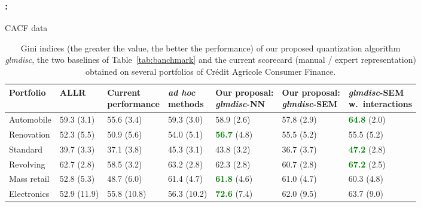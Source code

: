 \documentclass[english,xcolor={rgb,dvipsnames,table,usenames}]{beamer}
\begin{document}
\begin{frame}
\frametitle{\secname : \subsecname}

CACF data

\begin{table}
    \centering
        \caption{Gini indices (the greater the value, the better the performance) of our proposed quantization algorithm \textit{glmdisc}, the two baselines of Table~\ref{tab:banchmark} and the current scorecard (manual / expert representation) obtained on several portfolios of Cr\'edit Agricole Consumer Finance.}
    \label{tab:real_data_inter}
\begin{tiny}
\begin{tabular}{lllllll}
Portfolio & ALLR & \makecell{Current\\performance} & \makecell{\textit{ad hoc}\\methods} & \makecell{Our proposal:\\ \textit{glmdisc}-NN} & \makecell{Our proposal:\\ \textit{glmdisc}-SEM} & \makecell{\textit{glmdisc}-SEM\\ w.\ interactions} \\
\hline
Automobile & 59.3 (3.1) & 55.6 (3.4) & 59.3 (3.0) & 58.9 (2.6) & 57.8 (2.9) & \textcolor{green}{\bf{64.8}} (2.0) \\
Renovation & 52.3 (5.5) & 50.9 (5.6) & 54.0 (5.1) & \textcolor{green}{\bf{56.7}} (4.8) & 55.5 (5.2) & 55.5 (5.2) \\
Standard & 39.7 (3.3) & 37.1 (3.8) & 45.3 (3.1) & 43.8 (3.2) & 36.7 (3.7) & \textcolor{green}{\bf{47.2}} (2.8) \\
Revolving & 62.7 (2.8) & 58.5 (3.2) & 63.2 (2.8) & 62.3 (2.8) & 60.7 (2.8) & \textcolor{green}{\bf{67.2}} (2.5) \\
Mass retail & 52.8 (5.3) & 48.7 (6.0) & 61.4 (4.7) & \textcolor{green}{\bf{61.8}} (4.6) & 61.0 (4.7) & 60.3 (4.8) \\
Electronics & 52.9 (11.9) & 55.8 (10.8) & 56.3 (10.2)  & \textcolor{green}{\bf{72.6}} (7.4) & 62.0 (9.5) & 63.7 (9.0) \\
\end{tabular}
\end{tiny}
\end{table}

\end{frame}
\end{document}

